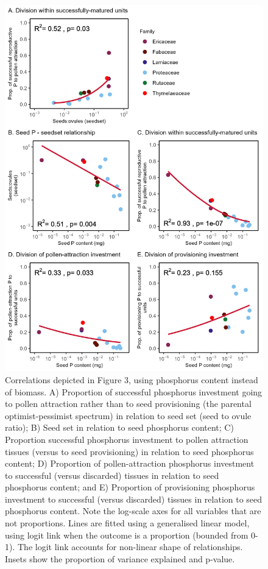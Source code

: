 \documentclass[10pt,twoside]{article}\usepackage[]{graphicx}\usepackage[]{color}
\begin{document}
\clearpage

\begin{figure}[h]
  \centering
  \includegraphics[width=12cm]{Figure3P.png}
  \caption{Correlations depicted in Figure 3, using phosphorus content instead of biomass. A) Proportion of successful phosphorus investment going to pollen attraction rather than to seed provisioning (the parental optimist-pessimist spectrum) in relation to seed set (seed to ovule ratio); B) Seed set in relation to seed phosphorus content; C) Proportion successful phosphorus investment to pollen attraction tissues (versus to seed provisioning) in relation to seed phosphorus content; D) Proportion of pollen-attraction phosphorus investment to successful (versus discarded) tissues in relation to seed phosphorus content; and E) Proportion of provisioning phosphorus investment to successful (versus discarded) tissues in relation to seed phosphorus content. Note the log-scale axes for all variables that are not proportions. Lines are fitted using a generalised linear model, using logit link when the outcome is a proportion (bounded from 0-1). The logit link accounts for non-linear shape of relationships. Insets show the proportion of variance explained and p-value.}
  \end{figure}
  
\end{document}
